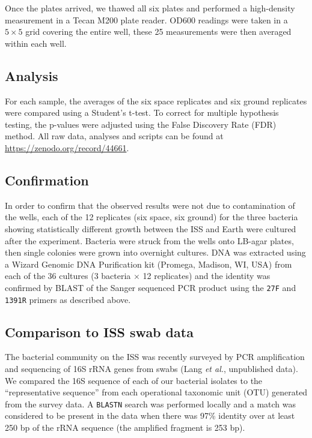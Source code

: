 Once the plates arrived, we thawed all six plates and performed a high-density measurement in a Tecan M200 plate reader. OD600 readings were taken in a $5\times 5$ grid covering the entire well, these 25 measurements were then averaged within each well.

\subsection{Analysis}

For each sample, the averages of the six space replicates and six ground replicates were compared using a Student's t-test. To correct for multiple hypothesis testing, the p-values were adjusted using the False Discovery Rate (FDR) method. \cite{benjamini_controlling_1995} All raw data, analyses and scripts can be found at \url{https://zenodo.org/record/44661}.

\subsection{Confirmation}

In order to confirm that the observed results were not due to contamination of the wells, each of the 12 replicates (six space, six ground) for the three bacteria showing statistically different growth between the ISS and Earth were cultured after the experiment. Bacteria were struck from the wells onto LB-agar plates, then single colonies were grown into overnight cultures. DNA was extracted using a Wizard Genomic DNA Purification kit (Promega, Madison, WI, USA) from each of the 36 cultures (3 bacteria $\times$ 12 replicates) and the identity was confirmed by BLAST of the Sanger sequenced PCR product using the {\tt 27F} and {\tt 1391R} primers as described above.

\subsection{Comparison to ISS swab data}

The bacterial community on the ISS was recently surveyed by PCR amplification and sequencing of 16S rRNA genes from swabs (Lang {\em et al.}, unpublished data). We compared the 16S sequence of each of our bacterial isolates to the ``representative sequence'' from each operational taxonomic unit (OTU) generated from the survey data. A {\tt BLASTN} search was performed locally and a match was considered to be present in the data when there was 97\% identity over at least 250 bp of the rRNA sequence (the amplified fragment is 253 bp).
